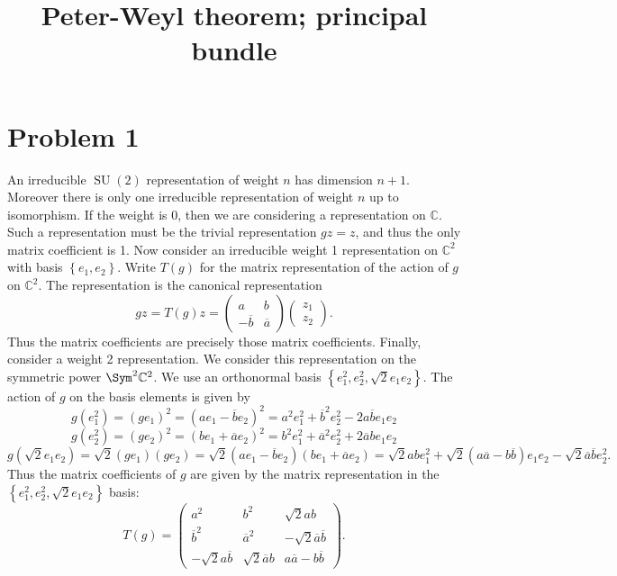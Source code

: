 \documentclass[11pt, letterpaper]{article}
\title{Peter-Weyl theorem; principal bundle}
\theoremstyle{plain}
\begin{document}
\makeproblem


\section*{Problem 1}
An irreducible $\operatorname{SU} (2)$ representation of weight $n$ has dimension $n+1$. Moreover there is only one irreducible representation of weight $n$ up to isomorphism. If the weight is 0, then we are considering a representation on $\mathbb{C} $. Such a representation must be the trivial representation $gz=z$, and thus the only matrix coefficient is 1. Now consider an irreducible weight 1 representation on $\mathbb{C} ^2$ with basis $\left\{ e_1,e_2 \right\} $. Write $T(g)$ for the matrix representation of the action of $g$ on $\mathbb{C} ^2$. The representation is the canonical representation
\[
	gz = T(g)z = \begin{pmatrix}
	a & b \\
	- \overline{b}  & \overline{a} 
	\end{pmatrix}\begin{pmatrix}
	z_1 \\
	z_2
	\end{pmatrix}
.\]
Thus the matrix coefficients are precisely those matrix coefficients. Finally, consider a weight 2 representation. We consider this representation on the symmetric power $\Sym ^2\mathbb{C} ^2$. We use an orthonormal basis $\left\{ e_1^2,e_2^2, \sqrt{2} e_1e_2 \right\} $. The action of $g$ on the basis elements is given by
\[
	g(e_1^2) = (ge_1)^2 = (ae_1 - \overline{b} e_2)^2 = a^2e_1^2 + \overline{b} ^2e_2^2 - 2a \overline{b} e_1e_2
\]
\[
	g(e_2^2) = \left( ge_2 \right) ^2 = (be_1 + \overline{a} e_2)^2 = b^2e_1^2 + \overline{a} ^2e_2^2 + 2 \overline{a} be_1e_2
\]
\[
	g(\sqrt{2} e_1e_2) = \sqrt{2} (ge_1)(ge_2) = \sqrt{2} (ae_1 - \overline{b} e_2)(be_1 + \overline{a} e_2) = \sqrt{2} abe_1^2 + \sqrt{2} (a \overline{a} - b \overline{b} )e_1e_2 - \sqrt{2} \overline{a} \overline{b} e_2^2
.\]
Thus the matrix coefficients of $g$ are given by the matrix representation in the $\left\{ e_1^2,e_2^2, \sqrt{2} e_1e_2 \right\} $ basis:
$$T(g) = \begin{pmatrix}
a^2 & b^2 & \sqrt{2}ab \\
\overline{b}^2 & \overline{a}^2 & -\sqrt{2}\overline{a}\overline{b} \\
-\sqrt{2}a\overline{b} & \sqrt{2}\overline{a}b & a\overline{a} - b\overline{b}
\end{pmatrix}.$$
\end{document}
